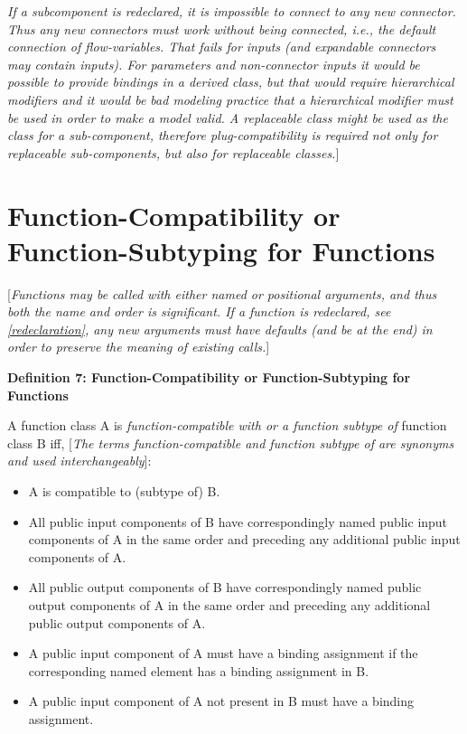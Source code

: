 \emph{If a subcomponent is redeclared, it is impossible to connect to
any new connector. Thus any new connectors must work without being
connected, i.e., the default connection of flow-variables. That fails
for inputs (and expandable connectors may contain inputs). For
parameters and non-connector inputs it would be possible to provide
bindings in a derived class, but that would require hierarchical
modifiers and it would be bad modeling practice that a hierarchical
modifier must be used in order to make a model valid. A replaceable
class might be used as the class for a sub-component, therefore
plug-compatibility is required not only for replaceable sub-components,
but also for replaceable classes.}{]}

\section{Function-Compatibility or Function-Subtyping for Functions}

{[}\emph{Functions may be called with either named or positional
arguments, and thus both the name and order is significant. If a
function is redeclared, see \autoref{redeclaration}, any new arguments must
have defaults (and be at the end) in order to preserve the meaning of
existing calls.}{]}

\textbf{Definition 7: Function-Compatibility or Function-Subtyping for Functions}

A function class A is \emph{function-compatible with or a function
subtype of} function class B iff, {[}\emph{The terms function-compatible
and function subtype of are synonyms and used interchangeably}{]}:

\begin{itemize}
\item
  A is compatible to (subtype of) B.
\item
  All public input components of B have correspondingly named public
  input components of A in the same order and preceding any additional
  public input components of A.
\item
  All public output components of B have correspondingly named public
  output components of A in the same order and preceding any additional
  public output components of A.
\item
  A public input component of A must have a binding assignment if the
  corresponding named element has a binding assignment in B.
\item
  A public input component of A not present in B must have a binding
  assignment.
\end{itemize}

